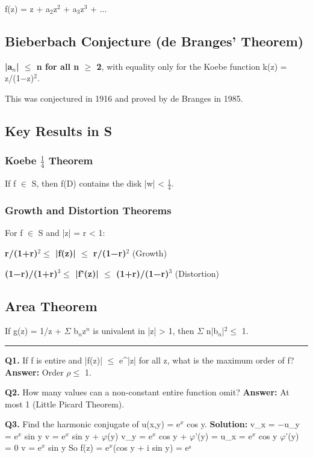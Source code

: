 \documentclass[12pt,a4paper,openany]{book}
\begin{document}
{{f(z) = z + a$_2$z$^2$ + a$_3$z$^3$ + ...

\subsection{Bieberbach Conjecture (de Branges' Theorem)}

\textbf{|a$_n$| $\leq$ n for all n $\geq$ 2}, with equality only for the Koebe function k(z) = z/(1−z)$^2$.

This was conjectured in 1916 and proved by de Branges in 1985.

\subsection{Key Results in S}

\subsubsection{Koebe $\frac{1}{4}$ Theorem}
If f $\in$ S, then f(D) contains the disk |w| < $\frac{1}{4}$.

\subsubsection{Growth and Distortion Theorems}
For f $\in$ S and |z| = r < 1:

\textbf{r/(1+r)$^2\leq$ |f(z)| $\leq$ r/(1−r)$^2$} (Growth)

\textbf{(1−r)/(1+r)$^3\leq$ |f'(z)| $\leq$ (1+r)/(1−r)$^3$} (Distortion)

\subsection{Area Theorem}
If g(z) = 1/z + $\Sigma$ b$_n$z$^n$ is univalent in |z| > 1, then $\Sigma$ n|b$_n$|$^2\leq$ 1.

\bigskip\noindent\rule{\textwidth}{0.4pt}\bigskip


\textbf{Q1.} If f is entire and |f(z)| $\leq$ e^|z| for all z, what is the maximum order of f?
\textbf{Answer:} Order $\rho\leq$ 1.

\textbf{Q2.} How many values can a non-constant entire function omit?
\textbf{Answer:} At most 1 (Little Picard Theorem).

\textbf{Q3.} Find the harmonic conjugate of u(x,y) = e$^x$ cos y.
\textbf{Solution:} v_x = −u_y = e$^x$ sin y  v = e$^x$ sin y + $\varphi$(y)
v_y = e$^x$ cos y + $\varphi$'(y) = u_x = e$^x$ cos y  $\varphi$'(y) = 0  v = e$^x$ sin y
So f(z) = e$^x$(cos y + i sin y) = eᶻ 

}}
\end{document}
